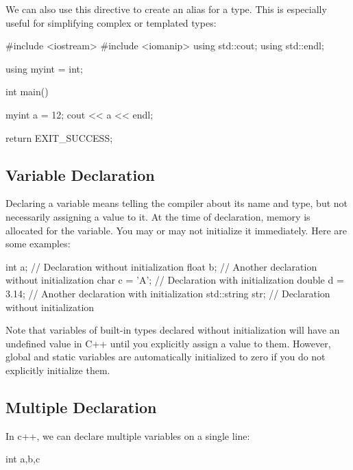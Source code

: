 \documentclass{report}
\begin{document}
    \bigbreak \noindent 
    We can also use this directive to create an alias for a type. This is especially useful for simplifying complex or templated types:
    \bigbreak \noindent 
    
    \begin{cppcode}
#include <iostream>
#include <iomanip>
using std::cout;
using std::endl;

using myint = int;

int main() {
    
    myint a = 12;
    cout << a << endl;

    return EXIT_SUCCESS;
}
    \end{cppcode}
    

    \pagebreak \bigbreak \noindent 
    \subsection{Variable Declaration}
    \bigbreak \noindent 
    Declaring a variable means telling the compiler about its name and type, but not necessarily assigning a value to it. At the time of declaration, memory is allocated for the variable. You may or may not initialize it immediately. Here are some examples:
    \bigbreak \noindent 
    
    \begin{cppcode}
int a;              // Declaration without initialization
float b;            // Another declaration without initialization
char c = 'A';       // Declaration with initialization
double d = 3.14;    // Another declaration with initialization
std::string str;    // Declaration without initialization
    \end{cppcode}
    
    \bigbreak \noindent 
    Note that variables of built-in types declared without initialization will have an undefined value in C++ until you explicitly assign a value to them. However, global and static variables are automatically initialized to zero if you do not explicitly initialize them.

    \bigbreak \noindent 
    \subsection{Multiple Declaration}
    \bigbreak \noindent 
    In c++, we can declare multiple variables on a single line:
    \bigbreak \noindent 
    
    \begin{cppcode}
int a,b,c
    \end{cppcode}
    
\end{document}
